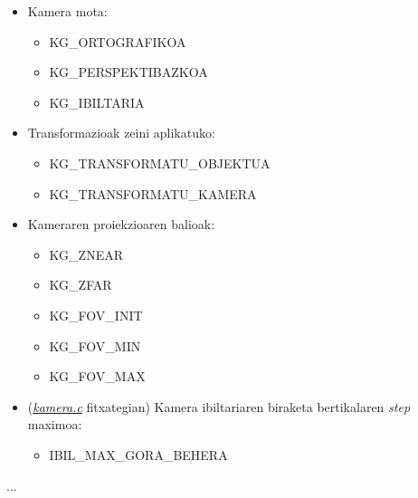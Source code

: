 \documentclass[12pt]{article}
\newcommand{\fitxategi}[1] {\underline{\textit{#1}}}
\begin{document}
\begin{itemize}
\item Kamera mota:
\begin{itemize}
\item KG\_ORTOGRAFIKOA
\item KG\_PERSPEKTIBAZKOA
\item KG\_IBILTARIA
\end{itemize}

\item Transformazioak zeini aplikatuko:
\begin{itemize}
\item KG\_TRANSFORMATU\_OBJEKTUA
\item KG\_TRANSFORMATU\_KAMERA
\end{itemize}

\item Kameraren proiekzioaren balioak:
\begin{itemize}
\item KG\_ZNEAR
\item KG\_ZFAR
\item KG\_FOV\_INIT
\item KG\_FOV\_MIN
\item KG\_FOV\_MAX
\end{itemize}

\item (\fitxategi{kamera.c} fitxategian) Kamera ibiltariaren biraketa bertikalaren \textit{step} maximoa:
\begin{itemize}
\item IBIL\_MAX\_GORA\_BEHERA
\end{itemize}

\end{itemize}

...



\end{document}
